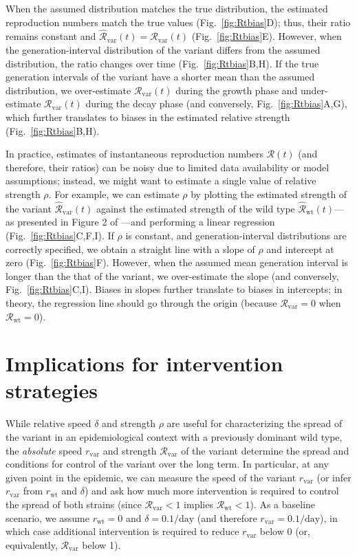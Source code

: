\documentclass[12pt]{article}
\newcommand{\fref}[1]{Fig.~\ref{fig:#1}}
\newcommand{\vvvar}{\mathrm{var}}
\newcommand{\wwwt}{\mathrm{wt}}
\newcommand{\rx}[1]{\ensuremath{{r}_{#1}}\xspace}
\newcommand{\rw}{\rx{\wwwt}}
\newcommand{\rv}{\rx{\vvvar}}
\newcommand{\Rx}[1]{\ensuremath{{\mathcal R}_{#1}}\xspace}
\newcommand{\RR}{\ensuremath{{\mathcal R}}\xspace}
\newcommand{\Rw}{\Rx{\wwwt}}
\newcommand{\Rv}{\Rx{\vvvar}}
\newcommand{\pday}{\ensuremath{/\textrm{day}}}
\begin{document}
When the assumed distribution matches the true distribution, the estimated reproduction numbers match the true values (\fref{Rtbias}D); thus, their ratio remains constant and $\hat{\RR}_{\textrm{var}}(t)=\Rv(t)$ (\fref{Rtbias}E).
However, when the generation-interval distribution of the variant differs from the assumed distribution, the ratio changes over time (\fref{Rtbias}B,H).
If the true generation intervals of the variant have a shorter mean than the assumed distribution, we over-estimate $\Rv(t)$ during the growth phase and under-estimate $\Rv(t)$ during the decay phase (and conversely, \fref{Rtbias}A,G), which further translates to biases in the estimated relative strength (\fref{Rtbias}B,H).

In practice, estimates of instantaneous reproduction numbers $\RR(t)$ (and therefore, their ratios) can be noisy due to limited data availability or model assumptions;
instead, we might want to estimate a single value of relative strength $\rho$.
For example, we can estimate $\rho$ by plotting the estimated strength of the variant $\hat{\RR}_{\textrm{var}}(t)$ against the estimated strength of the wild type $\hat{\RR}_{\textrm{wt}}(t)$---as presented in Figure 2 of \cite{volz2021transmission}---and performing a linear regression (\fref{Rtbias}C,F,I).
If $\rho$ is constant, and generation-interval distributions are correctly specified, we obtain a straight line with a slope of $\rho$ and intercept at zero (\fref{Rtbias}F).
However, when the assumed mean generation interval is longer than the that of the variant, we over-estimate the slope (and conversely, \fref{Rtbias}C,I).
Biases in slopes further translate to biases in intercepts; in theory, the regression line should go through the origin (because $\Rv = 0$ when $\Rw = 0$).

\section{Implications for intervention strategies}

While relative speed $\delta$ and strength $\rho$ are useful for characterizing the spread of the variant in an epidemiological context with a previously dominant wild type, the \emph{absolute} speed $\rv$ and strength $\Rv$ of the variant determine the spread and conditions for control of the variant over the long term.
In particular, at any given point in the epidemic, we can measure the speed of the variant $\rv$ (or infer $\rv$ from $\rw$ and $\delta$) and ask how much more intervention is required to control the spread of both strains (since $\Rv < 1$ implies $\Rw < 1$).
As a baseline scenario, we assume $\rw=0$ and $\delta=0.1\pday$ (and therefore $\rv=0.1\pday$), in which case additional intervention is required to reduce $\rv$ below 0 (or, equivalently, $\Rv$ below 1).
\end{document}

